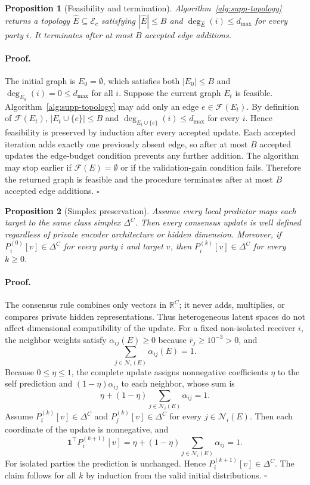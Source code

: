 \documentclass[letterpaper]{article}
\newcommand{\Ec}{\mathcal{E}_c}
\newcommand{\Ni}{\mathcal{N}_i}
\newcommand{\R}{\mathbb{R}}
\newtheorem{proposition}{Proposition}
\begin{document}
\begin{proposition}[Feasibility and termination]
Algorithm~\ref{alg:supp-topology} returns a topology
$\widehat E\subseteq\Ec$ satisfying $|\widehat E|\le B$ and
$\deg_{\widehat E}(i)\le d_{\max}$ for every party $i$. It terminates after at
most $B$ accepted edge additions.
\end{proposition}

\paragraph{Proof.}
The initial graph is $E_0=\emptyset$, which satisfies both
$|E_0|\le B$ and $\deg_{E_0}(i)=0\le d_{\max}$ for all $i$. Suppose the current
graph $E_t$ is feasible. Algorithm~\ref{alg:supp-topology} may add only an edge
$e\in\mathcal{F}(E_t)$. By definition of $\mathcal{F}(E_t)$,
$|E_t\cup\{e\}|\le B$ and
$\deg_{E_t\cup\{e\}}(i)\le d_{\max}$ for every $i$. Hence feasibility is
preserved by induction after every accepted update. Each accepted iteration
adds exactly one previously absent edge, so after at most $B$ accepted updates
the edge-budget condition prevents any further addition. The algorithm may stop
earlier if $\mathcal{F}(E)=\emptyset$ or if the validation-gain condition fails.
Therefore the returned graph is feasible and the procedure terminates after at
most $B$ accepted edge additions. \hfill$\square$

\begin{proposition}[Simplex preservation]
Assume every local predictor maps each target to the same class simplex
$\Delta^C$. Then every consensus update is well defined regardless of private
encoder architecture or hidden dimension. Moreover, if
$P_i^{(0)}[v]\in\Delta^C$ for every party $i$ and target $v$, then
$P_i^{(k)}[v]\in\Delta^C$ for every $k\ge0$.
\end{proposition}

\paragraph{Proof.}
The consensus rule combines only vectors in $\R^C$; it never adds, multiplies,
or compares private hidden representations. Thus heterogeneous latent spaces do
not affect dimensional compatibility of the update. For a fixed non-isolated
receiver $i$, the neighbor weights satisfy $\alpha_{ij}(E)\ge0$ because
$\bar r_j\ge10^{-3}>0$, and
\[
\sum_{j\in\Ni(E)}\alpha_{ij}(E)=1.
\]
Because $0\le\eta\le1$, the complete update assigns nonnegative coefficients
$\eta$ to the self prediction and $(1-\eta)\alpha_{ij}$ to each neighbor, whose
sum is
\[
\eta+(1-\eta)\sum_{j\in\Ni(E)}\alpha_{ij}=1.
\]
Assume $P_i^{(k)}[v]\in\Delta^C$ and
$P_j^{(k)}[v]\in\Delta^C$ for every $j\in\Ni(E)$. Then each coordinate of the
update is nonnegative, and
\[
\mathbf{1}^{\top}P_i^{(k+1)}[v]
=\eta+(1-\eta)\sum_{j\in\Ni(E)}\alpha_{ij}=1.
\]
For isolated parties the prediction is unchanged. Hence
$P_i^{(k+1)}[v]\in\Delta^C$. The claim follows for all $k$ by induction from
the valid initial distributions. \hfill$\square$
\end{document}

